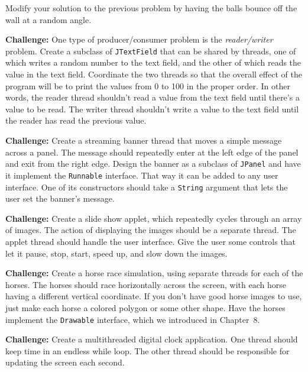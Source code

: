 \begin{EXRtwo}
\item  Modify your solution to the previous problem by having
the balls bounce off the wall at a random angle.


\item  {\bf Challenge:} One type of producer/consumer problem
is the {\it reader/writer} problem.  Create a subclass of
{\tt JTextField} that can be shared by threads, one of which writes a
random number to the text field, and the other of which reads the
value in the text field.  Coordinate the two threads so that the
overall effect of the program will be to print the values from 0
to 100 in the proper order.  In other words, the reader thread
shouldn't read a value from the text field until there's a value to
be read.   The writer thread shouldn't write a value to the text field
until the reader has read the previous value.

\item  {\bf Challenge:} Create a streaming banner thread that
moves a simple message across a panel.  The message should repeatedly
enter at the left edge of the panel and exit from the right
edge.  Design the banner as a subclass of {\tt JPanel} and have it
implement the {\tt Runnable} interface.  That way it can be added to
any user interface.  One of its constructors should take a {\tt String}
argument that lets the user set the banner's message.

\item {\bf Challenge: } Create a slide show applet, which repeatedly
cycles through an array of images.  The action of displaying the
images should be a separate thread.  The applet thread should handle
the user interface.  Give the user some controls that let it pause,
stop, start, speed up, and slow down the images.

\item  {\bf Challenge:} Create a horse race simulation, using separate
threads for each of the horses.  The horses should race horizontally
across the screen, with each horse having a different vertical
coordinate.  If you don't have good horse images to use, just
make each horse a colored polygon or some other shape.  Have the
horses implement the {\tt Drawable} interface, which we introduced
in Chapter~8.

\item  {\bf Challenge:} Create a multithreaded digital clock application.
One thread should keep time in an endless while loop. The other
thread should be responsible for updating the screen each second.

\end{EXRtwo}

